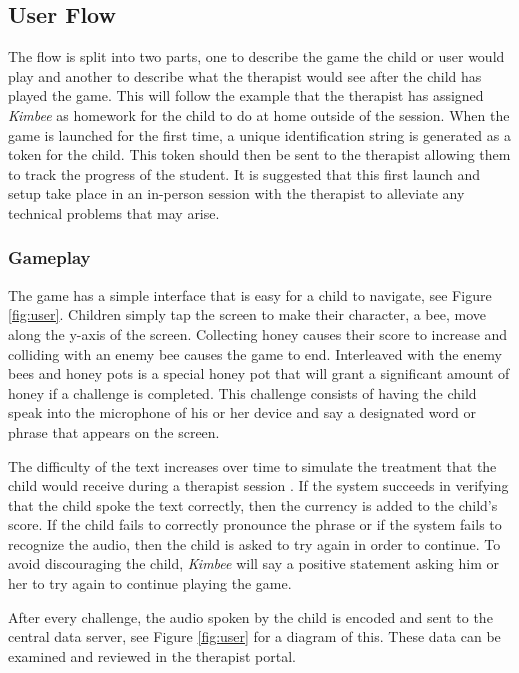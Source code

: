 \documentclass{sig-alternate-2013}
\begin{document}
\subsection{User Flow}

The flow is split into two parts, one to describe the game the child or user would play and another to describe what the therapist would see after the child has played the game. This will follow the example that the therapist has assigned {\em Kimbee} as homework for the child to do at home outside of the session. When the game is launched for the first time, a unique identification string is generated as a token for the child. This token should then be sent to the therapist allowing them to track the progress of the student. It is suggested that this first launch and setup take place in an in-person session with the therapist to alleviate any technical problems that may arise.

\subsubsection{Gameplay\label{sec:gameplay_flow}}

The game has a simple interface that is easy for a child to navigate, see Figure \ref{fig:user}. Children simply tap the screen to make their character, a bee, move along the y-axis of the screen. Collecting honey causes their score to increase and colliding with an enemy bee causes the game to end. Interleaved with the enemy bees and honey pots is a special honey pot that will grant a significant amount of honey if a challenge is completed. This challenge consists of having the child speak into the microphone of his or her device and say a designated word or phrase that appears on the screen.

The difficulty of the text increases over time to simulate the treatment that the child would receive during a therapist session \cite{Rosenbek:Treatment}. If the system succeeds in verifying that the child spoke the text correctly, then the currency is added to the child's score. If the child fails to correctly pronounce the phrase or if the system fails to recognize the audio, then the child is asked to try again in order to continue. To avoid discouraging the child, {\em Kimbee} will say a positive statement asking him or her to try again to continue playing the game.

After every challenge, the audio spoken by the child is encoded and sent to the central data server, see Figure \ref{fig:user} for a diagram of this. These data can be examined and reviewed in the therapist portal.
\end{document}
